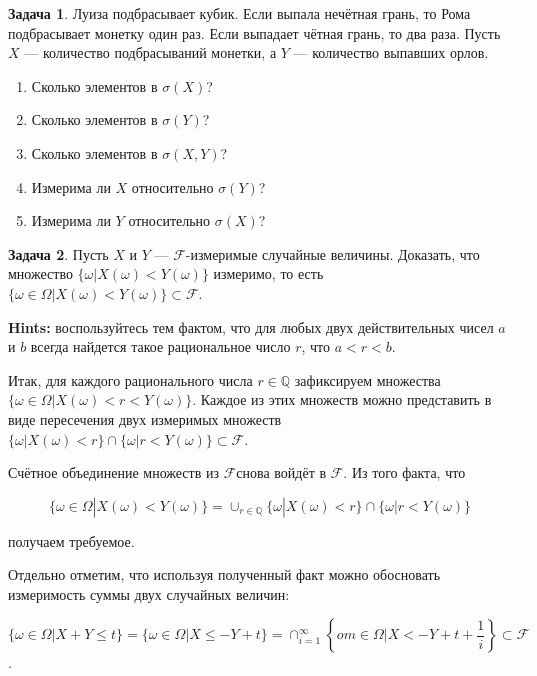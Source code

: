 \documentclass[pdftex, 12pt, a4paper]{article}
\def \mbb{\mathbb}
\def \Q{\mbb Q}
\def\F{\ensuremath{\mathcal{F}}} %
\def\s{\ensuremath{\sigma}}
\def \Om{\Omega}
\def \om{\omega}
\renewcommand{\le}{\leqslant}
\theoremstyle{definition} %
\newtheorem{problem}{Задача}
\numberwithin{problem}{section}
\numberwithin{blits}{section}
\begin{document}
\begin{problem}
Луиза подбрасывает кубик. Если выпала нечётная грань, то Рома подбрасывает монетку один раз. Если выпадает чётная грань, то два раза. Пусть $X$ --- количество подбрасываний монетки, а $Y$ --- количество выпавших орлов. 

\begin{enumerate}
\item Сколько элементов в $\s(X)$?
\item Сколько элементов в $\s(Y)$?
\item Сколько элементов в $\s(X,Y)$?
\item Измерима ли $X$ относительно $\s(Y)$?
\item Измерима ли $Y$ относительно $\s(X)$?
\end{enumerate}
\begin{sol}

\end{sol}
\end{problem}




\begin{problem}
Пусть $X$ и $Y$ --- \F-измеримые случайные величины. Доказать, что множество $\{\om | X(\om) < Y(\om) \}$ измеримо, то есть $\{\om \in \Om | X(\om) < Y(\om) \} \subset \F$.

\textbf{Hints:} воспользуйтесь тем фактом, что для любых двух действительных чисел $a$ и $b$ всегда найдется такое рациональное число $r$, что $a<r<b$.
\begin{sol}
Итак, для каждого рационального числа $r \in \Q$ зафиксируем множества$\{\om \in \Om | X(\om) < r < Y(\om)\}$. Каждое из этих множеств можно представить в виде пересечения двух измеримых множеств $\{ \om | X(\om) <r \} \cap \{\om | r < Y(\om)\} \subset \F$.

Счётное объединение множеств из \F снова войдёт в \F. Из того факта, что 

\[  \{\om \in \Om | X(\om) < Y(\om) \} = \cup_{r \in \Q} \{ \om | X(\om) <r \} \cap \{\om | r < Y(\om)\} \] 

получаем требуемое.


Отдельно отметим, что используя полученный факт можно обосновать измеримость суммы двух случайных величин:

\[\{\om \in \Om | X + Y \le t\} = \{\om \in \Om | X \le -Y +t \} = \cap_{i=1}^{\infty} \left\{om \in \Om | X < - Y + t + \frac{1}{i} \right\} \subset \F \].
\end{sol}
\end{problem}


\end{document}
